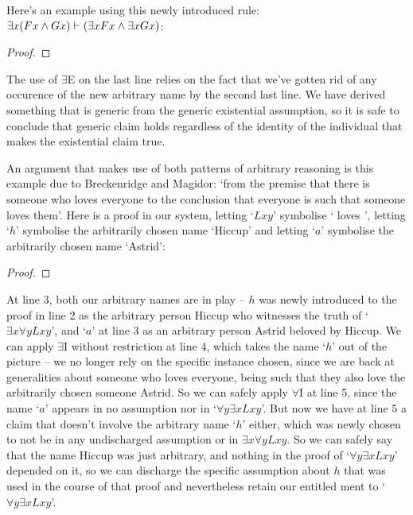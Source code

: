 Here's an example using this newly introduced rule: $\exists x (Fx \wedge Gx) \vdash (\exists x Fx \wedge \exists x Gx)$: 
\begin{proof}
    	\open
    	\close
    \end{proof} The use of $\exists$E on the last line relies on the fact that we've gotten rid of any occurence of the new arbitrary name by the second last line. We have derived something that is generic from the generic existential assumption, so it is safe to conclude that generic claim holds regardless of the identity of the individual that makes the existential claim true.

An argument that makes use of both patterns of arbitrary reasoning is this example due to Breckenridge and Magidor: `from the premise that there is someone who loves everyone to the conclusion that everyone is such that someone loves them'. Here is a proof in our system, letting `$Lxy$' symbolise ` loves ', letting `$h$' symbolise the arbitrarily chosen name `Hiccup' and letting `$a$' symbolise the arbitrarily chosen name `Astrid': \begin{proof}
	\open
	\close
\end{proof} At line 3, both our arbitrary names are in play – $h$ was newly introduced to the proof in line 2 as the arbitrary person Hiccup who witnesses the truth of `$\exists x \forall y Lxy$', and `$a$' at line 3 as an arbitrary person Astrid beloved by Hiccup. We can apply $\exists$I without restriction at line 4, which takes the name `$h$' out of the picture – we no longer rely on the specific instance chosen, since we are back at generalities about someone who loves everyone, being such that they also love the arbitrarily chosen someone Astrid. So we can safely apply $\forall$I at line 5, since the name `$a$' appears in no assumption nor in `$\forall y\exists x Lxy$'. But now we have at line 5 a claim that doesn't involve the arbitrary name `$h$' either, which was newly chosen to not be in any undischarged assumption or in $\exists x \forall y Lxy$. So we can safely say that the name Hiccup was just arbitrary, and nothing in the proof of `$\forall y\exists x Lxy$' depended on it, so we can discharge the specific assumption about $h$ that was used in the course of that proof and nevertheless retain our entitled ment to `$\forall y\exists x Lxy$'. 



